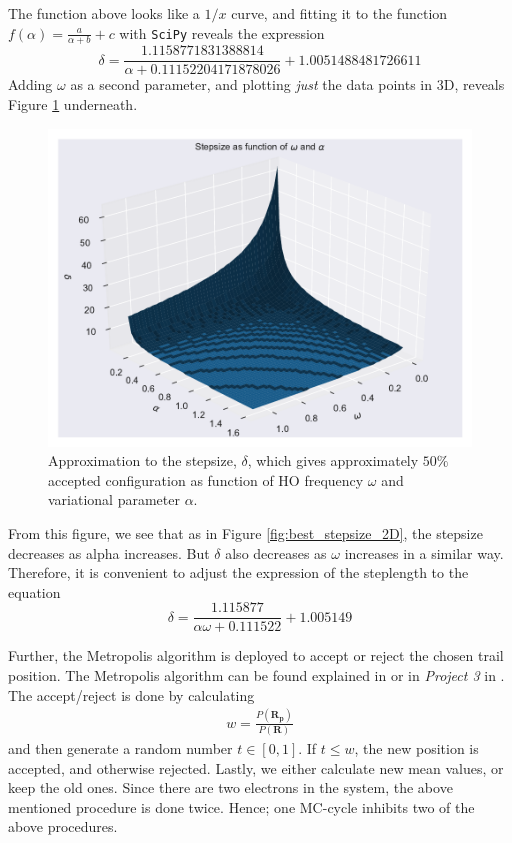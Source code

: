 \documentclass[12pt,english,a4paper]{article}
\begin{document}
The function above looks like a $1/x$ curve, and fitting it to the function $f(\alpha)=\frac{a}{\alpha +b}+c$ with \texttt{SciPy} reveals the expression
\begin{equation}
    \delta = \frac{1.1158771831388814}{\alpha+0.11152204171878026}+1.0051488481726611
\end{equation}
Adding $\omega$ as a second parameter, and plotting \textit{just} the data points in 3D, reveals Figure \ref{fig:best_stepsize_3D} underneath.
\begin{figure}[H]
    \centering
    \includegraphics[scale=0.7]{../figures/best_steplength_3D.pdf}
    \caption{Approximation to the stepsize, $\delta$, which gives approximately $50\%$ accepted configuration as function of HO frequency $\omega$ and variational parameter $\alpha$.}
    \label{fig:best_stepsize_3D}
\end{figure}
From this figure, we see that as in Figure \ref{fig:best_stepsize_2D}, the stepsize decreases as alpha increases. But $\delta$ also decreases as $\omega$ increases in a similar way. Therefore, it is convenient to adjust the expression of the steplength to the equation
\begin{equation}
    \delta=\frac{1.115877}{\alpha\omega+0.111522}+1.005149
\end{equation}

Further, the Metropolis algorithm is deployed to accept or reject the chosen trail position. The Metropolis algorithm can be found explained in \cite{Lec15} or in \textit{Project 3} in \cite{GitHub}. The accept/reject is done by calculating
\begin{align*}
    w=\frac{P(\boldsymbol{R_p})}{P(\boldsymbol{R})}
\end{align*}
and then generate a random number $t\in[0,1]$. If $t\leq w$, the new position is accepted, and otherwise rejected. Lastly, we either calculate new mean values, or keep the old ones. Since there are two electrons in the system, the above mentioned procedure is done twice. Hence; one MC-cycle inhibits two of the above procedures.
\end{document}
